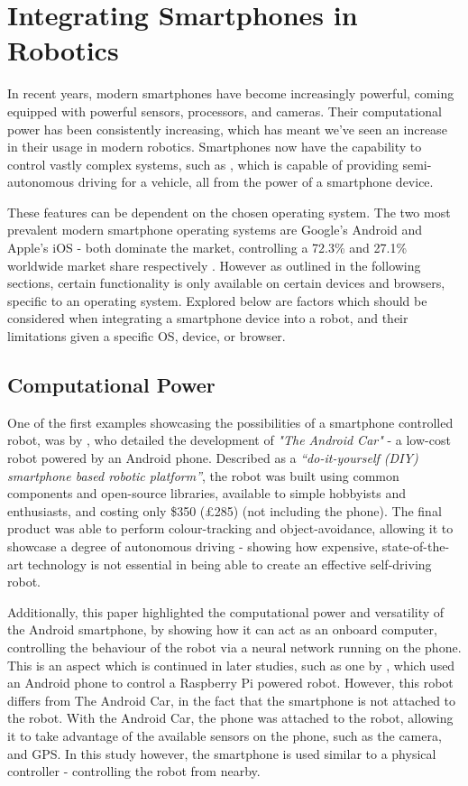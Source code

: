 \documentclass{l4proj}
\begin{document}
\section{Integrating Smartphones in Robotics}\label{sec:smartphone-background}
In recent years, modern smartphones have become increasingly powerful, coming equipped with powerful sensors, processors, and cameras. Their computational power has been consistently increasing, which has meant we’ve seen an increase in their usage in modern robotics. Smartphones now have the capability to control vastly complex systems, such as \citet{comma}, which is capable of providing semi-autonomous driving for a vehicle, all from the power of a smartphone device. 

These features can be dependent on the chosen operating system. The two most prevalent modern smartphone operating systems are Google’s Android and Apple’s iOS - both dominate the market, controlling a 72.3\% and 27.1\% worldwide market share respectively \citep{osmarketshare}. However as outlined in the following sections, certain functionality is only available on certain devices and browsers, specific to an operating system. Explored below are factors which should be considered when integrating a smartphone device into a robot, and their limitations given a specific OS, device, or browser.

\subsection{Computational Power}
One of the first examples showcasing the possibilities of a smartphone controlled robot, was by \citet{oros2013smartphone}, who detailed the development of \textit{"The Android Car"} - a low-cost robot powered by an Android phone. Described as a \textit{“do-it-yourself (DIY) smartphone based robotic platform”}, the robot was built using common components and open-source libraries, available to simple hobbyists and enthusiasts, and costing only \$350 (£285) (not including the phone). The final product was able to perform colour-tracking and object-avoidance, allowing it to showcase a degree of autonomous driving - showing how expensive, state-of-the-art technology is not essential in being able to create an effective self-driving robot.

Additionally, this paper highlighted the computational power and versatility of the Android smartphone, by showing how it can act as an onboard computer, controlling the behaviour of the robot via a neural network running on the phone. This is an aspect which is continued in later studies, such as one by \citet{7754547}, which used an Android phone to control a Raspberry Pi powered robot. However, this robot differs from The Android Car, in the fact that the smartphone is not attached to the robot. With the Android Car, the phone was attached to the robot, allowing it to take advantage of the available sensors on the phone, such as the camera, and GPS. In this study however, the smartphone is used similar to a physical controller - controlling the robot from nearby.
\end{document}
